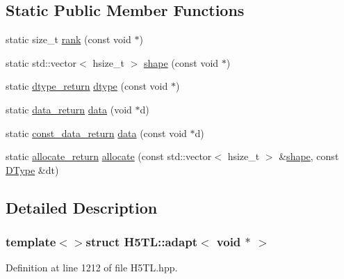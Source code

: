 \subsection*{Static Public Member Functions}
\begin{DoxyCompactItemize}
\item 
static size\-\_\-t \hyperlink{struct_h5_t_l_1_1adapt_3_01void_01_5_01_4_a961f7e104389bceaa3b247eb619e7908}{rank} (const void $\ast$)
\item 
static std\-::vector$<$ hsize\-\_\-t $>$ \hyperlink{struct_h5_t_l_1_1adapt_3_01void_01_5_01_4_a579ef60d14c11af448df409f4c50977d}{shape} (const void $\ast$)
\item 
static \hyperlink{struct_h5_t_l_1_1adapt_3_01void_01_5_01_4_a12b8f26716992f31fd532804fe4895cc}{dtype\-\_\-return} \hyperlink{struct_h5_t_l_1_1adapt_3_01void_01_5_01_4_a2cb14fff29411980be930572835937a4}{dtype} (const void $\ast$)
\item 
static \hyperlink{struct_h5_t_l_1_1adapt_3_01void_01_5_01_4_a4c6e9d65ebdbec1d46d20fc905c4e4cb}{data\-\_\-return} \hyperlink{struct_h5_t_l_1_1adapt_3_01void_01_5_01_4_a17ef54f71d3bf7797f03fd29c5be81e7}{data} (void $\ast$d)
\item 
static \hyperlink{struct_h5_t_l_1_1adapt_3_01void_01_5_01_4_af1fde85ce8f3296282fe22e6ee5b9c46}{const\-\_\-data\-\_\-return} \hyperlink{struct_h5_t_l_1_1adapt_3_01void_01_5_01_4_a1c6b5e968df8c453913c439eadc3831d}{data} (const void $\ast$d)
\item 
static \hyperlink{struct_h5_t_l_1_1adapt_3_01void_01_5_01_4_ae25684c819a12a21c43243c76650cb08}{allocate\-\_\-return} \hyperlink{struct_h5_t_l_1_1adapt_3_01void_01_5_01_4_a7cd0a2071ea1127f809718f0b8b8924e}{allocate} (const std\-::vector$<$ hsize\-\_\-t $>$ \&\hyperlink{struct_h5_t_l_1_1adapt_3_01void_01_5_01_4_a579ef60d14c11af448df409f4c50977d}{shape}, const \hyperlink{class_h5_t_l_1_1_d_type}{D\-Type} \&dt)
\end{DoxyCompactItemize}


\subsection{Detailed Description}
\subsubsection*{template$<$$>$struct H5\-T\-L\-::adapt$<$ void $\ast$ $>$}



Definition at line 1212 of file H5\-T\-L.\-hpp.



